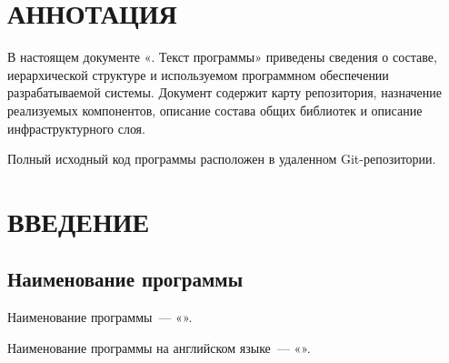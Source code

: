 \documentclass[12pt,a4paper]{extarticle}
\begin{document}
\sloppy





\section*{АННОТАЦИЯ}

В настоящем документе «\projectname. Текст программы» приведены сведения о составе, иерархической структуре и используемом программном обеспечении разрабатываемой системы. Документ содержит карту репозитория, назначение реализуемых компонентов, описание состава общих библиотек и описание инфраструктурного слоя.

Полный исходный код программы расположен в удаленном Git-репозитории. 

\clearpage

\hypersetup{linkcolor=black}
\tableofcontents
\hypersetup{linkcolor=blue}
\thispagestyle{fancy}
\clearpage

\section{ВВЕДЕНИЕ}

\subsection{Наименование программы}

Наименование программы~--- «\projectname».

Наименование программы на английском языке~--- «\hseProjectNameEn».
\end{document}
